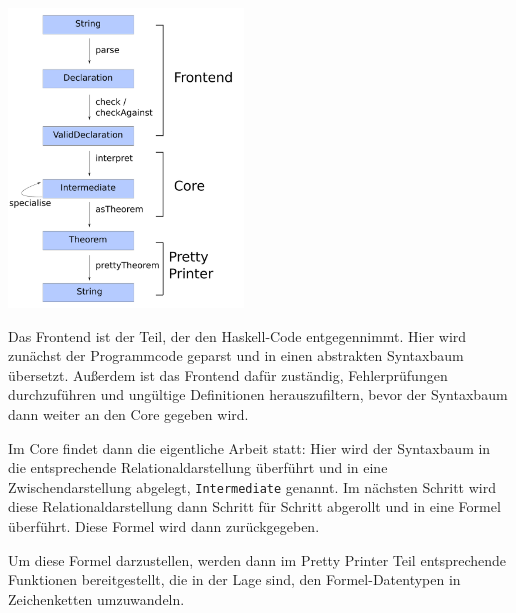 \includegraphics[height=300px]{overview-free-theorems}

Das Frontend ist der Teil, der den Haskell-Code entgegennimmt. Hier wird zunächst der Programmcode geparst und in einen
abstrakten Syntaxbaum übersetzt. Außerdem ist das Frontend dafür zuständig, Fehlerprüfungen durchzuführen und
ungültige Definitionen herauszufiltern, bevor der Syntaxbaum dann weiter an den Core gegeben wird.


Im Core findet dann die eigentliche Arbeit statt: Hier wird der Syntaxbaum in die entsprechende Relationaldarstellung
überführt und in eine Zwischendarstellung abgelegt, \texttt{Intermediate} genannt. Im nächsten Schritt wird diese
Relationaldarstellung dann Schritt für Schritt abgerollt und in eine Formel überführt. Diese Formel wird dann zurückgegeben.

Um diese Formel darzustellen, werden dann im Pretty Printer Teil entsprechende Funktionen bereitgestellt, die in der Lage
sind, den Formel-Datentypen in Zeichenketten umzuwandeln.




